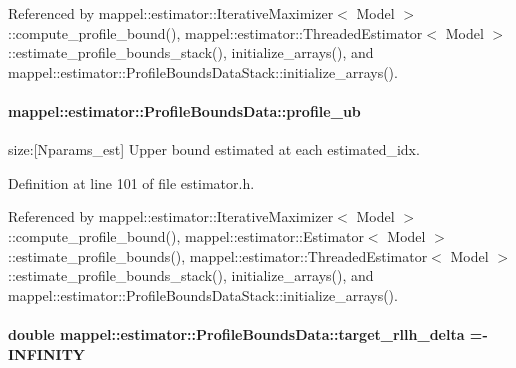 Referenced by mappel\+::estimator\+::\+Iterative\+Maximizer$<$ Model $>$\+::compute\+\_\+profile\+\_\+bound(), mappel\+::estimator\+::\+Threaded\+Estimator$<$ Model $>$\+::estimate\+\_\+profile\+\_\+bounds\+\_\+stack(), initialize\+\_\+arrays(), and mappel\+::estimator\+::\+Profile\+Bounds\+Data\+Stack\+::initialize\+\_\+arrays().

\paragraph[{\texorpdfstring{profile\+\_\+ub}{profile_ub}}]{ mappel\+::estimator\+::\+Profile\+Bounds\+Data\+::profile\+\_\+ub}\hypertarget{structmappel_1_1estimator_1_1ProfileBoundsData_a8c7233892f731a927d21ec086eaca33f}{}\label{structmappel_1_1estimator_1_1ProfileBoundsData_a8c7233892f731a927d21ec086eaca33f}


size\+:\mbox{[}Nparams\+\_\+est\mbox{]} Upper bound estimated at each estimated\+\_\+idx. 



Definition at line 101 of file estimator.\+h.



Referenced by mappel\+::estimator\+::\+Iterative\+Maximizer$<$ Model $>$\+::compute\+\_\+profile\+\_\+bound(), mappel\+::estimator\+::\+Estimator$<$ Model $>$\+::estimate\+\_\+profile\+\_\+bounds(), mappel\+::estimator\+::\+Threaded\+Estimator$<$ Model $>$\+::estimate\+\_\+profile\+\_\+bounds\+\_\+stack(), initialize\+\_\+arrays(), and mappel\+::estimator\+::\+Profile\+Bounds\+Data\+Stack\+::initialize\+\_\+arrays().

\paragraph[{\texorpdfstring{target\+\_\+rllh\+\_\+delta}{target_rllh_delta}}]{\setlength{\rightskip}{0pt plus 5cm}double mappel\+::estimator\+::\+Profile\+Bounds\+Data\+::target\+\_\+rllh\+\_\+delta =-\/I\+N\+F\+I\+N\+I\+TY}\hypertarget{structmappel_1_1estimator_1_1ProfileBoundsData_a524173c1125ec843b904feb119fb182b}{}\label{structmappel_1_1estimator_1_1ProfileBoundsData_a524173c1125ec843b904feb119fb182b}


